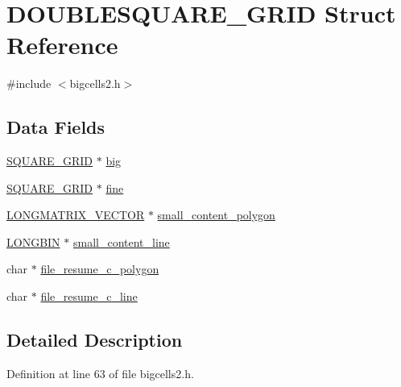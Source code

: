 \hypertarget{struct_d_o_u_b_l_e_s_q_u_a_r_e___g_r_i_d}{\section{D\-O\-U\-B\-L\-E\-S\-Q\-U\-A\-R\-E\-\_\-\-G\-R\-I\-D Struct Reference}
\label{struct_d_o_u_b_l_e_s_q_u_a_r_e___g_r_i_d}
}


{\ttfamily \#include $<$bigcells2.\-h$>$}

\subsection*{Data Fields}
\begin{DoxyCompactItemize}
\item 
\hyperlink{struct_s_q_u_a_r_e___g_r_i_d}{S\-Q\-U\-A\-R\-E\-\_\-\-G\-R\-I\-D} $\ast$ \hyperlink{struct_d_o_u_b_l_e_s_q_u_a_r_e___g_r_i_d_a5bc332bdc1ef4c2452778c2d26ad0c4c}{big}
\item 
\hyperlink{struct_s_q_u_a_r_e___g_r_i_d}{S\-Q\-U\-A\-R\-E\-\_\-\-G\-R\-I\-D} $\ast$ \hyperlink{struct_d_o_u_b_l_e_s_q_u_a_r_e___g_r_i_d_a4ad68ee9c6dda1e32b357dc1be36953c}{fine}
\item 
\hyperlink{struct_l_o_n_g_m_a_t_r_i_x___v_e_c_t_o_r}{L\-O\-N\-G\-M\-A\-T\-R\-I\-X\-\_\-\-V\-E\-C\-T\-O\-R} $\ast$ \hyperlink{struct_d_o_u_b_l_e_s_q_u_a_r_e___g_r_i_d_a7edbcfb3ad0fbc98dbaea66ba5ba7587}{small\-\_\-content\-\_\-polygon}
\item 
\hyperlink{struct_l_o_n_g_b_i_n}{L\-O\-N\-G\-B\-I\-N} $\ast$ \hyperlink{struct_d_o_u_b_l_e_s_q_u_a_r_e___g_r_i_d_a5d612d3850c4ce4f7327491024e0df6c}{small\-\_\-content\-\_\-line}
\item 
char $\ast$ \hyperlink{struct_d_o_u_b_l_e_s_q_u_a_r_e___g_r_i_d_a5b8e6e5a9c93dcf6a98b48a6db24bb7e}{file\-\_\-resume\-\_\-c\-\_\-polygon}
\item 
char $\ast$ \hyperlink{struct_d_o_u_b_l_e_s_q_u_a_r_e___g_r_i_d_a8b1d557771e5f66e5b656af20eba8759}{file\-\_\-resume\-\_\-c\-\_\-line}
\end{DoxyCompactItemize}


\subsection{Detailed Description}


Definition at line 63 of file bigcells2.\-h.



